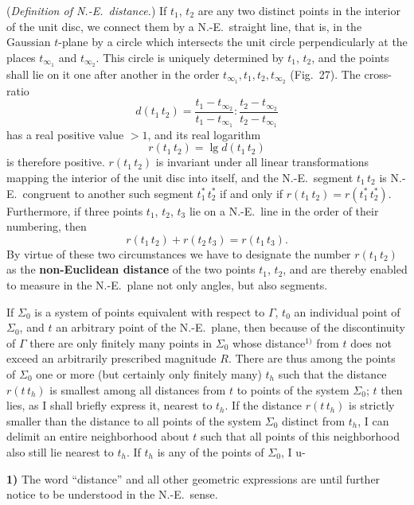 \documentclass{article}
\begin{document}
(\emph{Definition of N.-E.\ distance.}) If $t_1$, $t_2$ are any two distinct points in the interior of the unit disc, we connect them by a N.-E.\ straight line, that is, in the Gaussian $t$-plane by a circle which intersects the unit circle perpendicularly at the places $t_{\infty_1}$ and $t_{\infty_2}$. This circle is uniquely determined by $t_1$, $t_2$, and the points shall lie on it one after another in the order $t_{\infty_1}, t_1, t_2, t_{\infty_2}$ (Fig.~27). The cross-ratio
\[ d(t_1\,t_2) = \frac{t_1 - t_{\infty_2}}{t_1 - t_{\infty_1}} : \frac{t_2 - t_{\infty_2}}{t_2 - t_{\infty_1}} \]
has a real positive value $> 1$, and its real logarithm
\[ r(t_1\,t_2) = \lg d(t_1\,t_2) \]
is therefore positive. $r(t_1\,t_2)$ is invariant under all linear transformations mapping the interior of the unit disc into itself, and the N.-E.\ segment $t_1\,t_2$ is N.-E.\ congruent to another such segment $t_1^*\,t_2^*$ if and only if $r(t_1\,t_2) = r(t_1^*\,t_2^*)$. Furthermore, if three points $t_1$, $t_2$, $t_3$ lie on a N.-E.\ line in the order of their numbering, then
\[ r(t_1\,t_2) + r(t_2\,t_3) = r(t_1\,t_3). \]
By virtue of these two circumstances we have to designate the number $r(t_1\,t_2)$ as the \textbf{non-Euclidean distance} of the two points $t_1$, $t_2$, and are thereby enabled to measure in the N.-E.\ plane not only angles, but also segments.

If $\Sigma_0$ is a system of points equivalent with respect to $\varGamma$, $t_0$ an individual point of $\Sigma_0$, and $t$ an arbitrary point of the N.-E.\ plane, then because of the discontinuity of $\varGamma$ there are only finitely many points in $\Sigma_0$ whose distance${}^{1)}$ from $t$ does not exceed an arbitrarily prescribed magnitude $R$. There are thus among the points of $\Sigma_0$ one or more (but certainly only finitely many) $t_h$ such that the distance $r(t\,t_h)$ is smallest among all distances from $t$ to points of the system $\Sigma_0$; $t$ then lies, as I shall briefly express it, nearest to $t_h$. If the distance $r(t\,t_h)$ is strictly smaller than the distance to all points of the system $\Sigma_0$ distinct from $t_h$, I can delimit an entire neighborhood about $t$ such that all points of this neighborhood also still lie nearest to $t_h$. If $t_h$ is any of the points of $\Sigma_0$, I u-

\textbf{1)} The word ``distance'' and all other geometric expressions are until further notice to be understood in the N.-E.\ sense.
\end{document}
